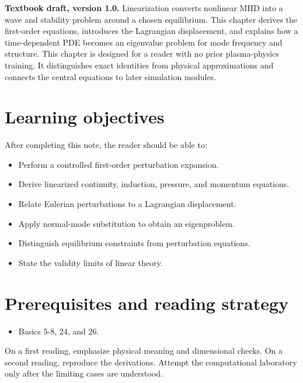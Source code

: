\documentclass[11pt]{article}
\begin{document}

\begin{overviewbox}
\textbf{Textbook draft, version 1.0.} Linearization converts nonlinear MHD into a wave and stability problem around a chosen equilibrium. This chapter derives the first-order equations, introduces the Lagrangian displacement, and explains how a time-dependent PDE becomes an eigenvalue problem for mode frequency and structure. This chapter is designed for a reader with no prior plasma-physics training. It distinguishes exact identities from physical approximations and connects the central equations to later simulation modules.
\end{overviewbox}

\ProjectTOC

\section{Learning objectives}
After completing this note, the reader should be able to:
\begin{itemize}[leftmargin=1.6em]
\item Perform a controlled first-order perturbation expansion.
\item Derive linearized continuity, induction, pressure, and momentum equations.
\item Relate Eulerian perturbations to a Lagrangian displacement.
\item Apply normal-mode substitution to obtain an eigenproblem.
\item Distinguish equilibrium constraints from perturbation equations.
\item State the validity limits of linear theory.
\end{itemize}

\section{Prerequisites and reading strategy}
\begin{itemize}[leftmargin=1.6em]
\item Basics 5-8, 24, and 26.
\end{itemize}
On a first reading, emphasize physical meaning and dimensional checks. On a second reading, reproduce the derivations. Attempt the computational laboratory only after the limiting cases are understood.
\end{document}
